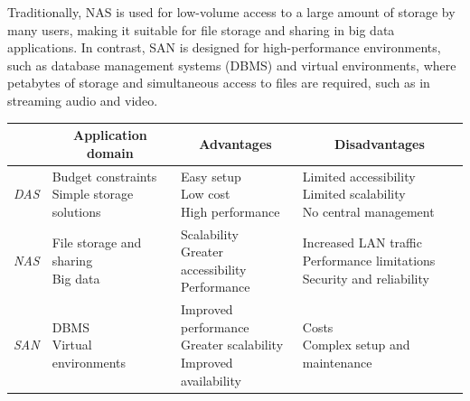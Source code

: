 Traditionally, NAS is used for low-volume access to a large amount of storage by many users, making it suitable for file storage and sharing in big data applications. 
In contrast, SAN is designed for high-performance environments, such as database management systems (DBMS) and virtual environments, where petabytes of storage and simultaneous access to files are required, such as in streaming audio and video.
\begin{table}[H]
    \centering
    \begin{tabular}{|c|lll|}
    \hline
                       & \multicolumn{1}{c}{\textbf{Application domain}}                                                        & \multicolumn{1}{c}{\textbf{Advantages}}                                                                                                                  & \multicolumn{1}{c|}{\textbf{Disadvantages}}    \\ \hline
    \textit{DAS}       & \makecell{Budget constraints \\ Simple storage solutions} & \makecell{Easy setup \\ Low cost \\ High performance}                           & \makecell{Limited accessibility \\ Limited scalability \\ No central management} \\\hline
    \textit{NAS}       & \makecell{File storage and sharing \\ Big data}           & \makecell{Scalability \\ Greater accessibility \\ Performance}                  & \makecell{Increased LAN traffic \\ Performance limitations \\ Security and reliability}     \\ \hline
    \textit{SAN}       & \makecell{DBMS \\ Virtual environments}                   & \makecell{Improved performance \\ Greater scalability \\ Improved availability} & \makecell{Costs \\ Complex setup and maintenance}           \\ \hline                                                            
    \end{tabular}
\end{table}